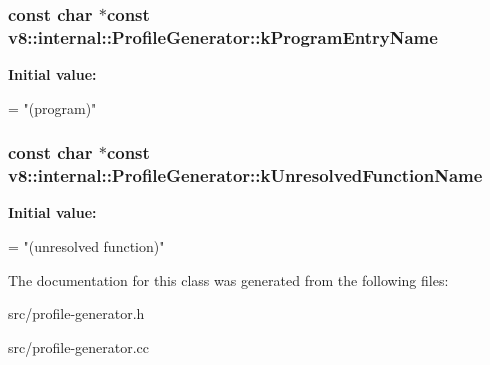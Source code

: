 \subsubsection[{k\+Program\+Entry\+Name}]{\setlength{\rightskip}{0pt plus 5cm}const char $\ast$const v8\+::internal\+::\+Profile\+Generator\+::k\+Program\+Entry\+Name\hspace{0.3cm}{\ttfamily [static]}}\label{classv8_1_1internal_1_1_profile_generator_a5c858e88eaf2ce61922e772d7917b94a}
{\bfseries Initial value\+:}
\begin{DoxyCode}
=
    \textcolor{stringliteral}{"(program)"}
\end{DoxyCode}
\hypertarget{classv8_1_1internal_1_1_profile_generator_a89aba0ecc28829cf41e8058109fe2037}{}
\subsubsection[{k\+Unresolved\+Function\+Name}]{\setlength{\rightskip}{0pt plus 5cm}const char $\ast$const v8\+::internal\+::\+Profile\+Generator\+::k\+Unresolved\+Function\+Name\hspace{0.3cm}{\ttfamily [static]}}\label{classv8_1_1internal_1_1_profile_generator_a89aba0ecc28829cf41e8058109fe2037}
{\bfseries Initial value\+:}
\begin{DoxyCode}
=
    \textcolor{stringliteral}{"(unresolved function)"}
\end{DoxyCode}


The documentation for this class was generated from the following files\+:\begin{DoxyCompactItemize}
\item 
src/profile-\/generator.\+h\item 
src/profile-\/generator.\+cc\end{DoxyCompactItemize}

